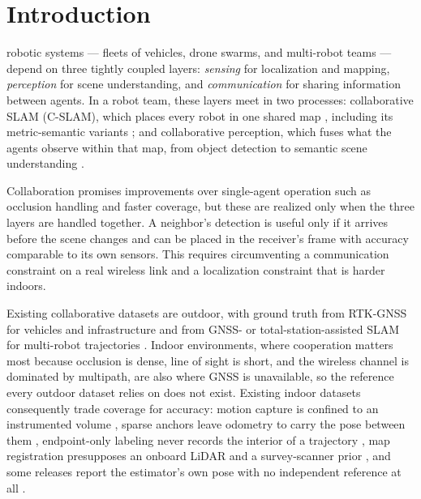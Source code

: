 \documentclass[journal]{IEEEtran}
\begin{document}
\section{Introduction}
\label{sec:introduction}
 robotic systems --- fleets of vehicles, drone swarms, and
multi-robot teams --- depend on three tightly coupled layers:
\emph{sensing} for localization and mapping, \emph{perception} for
scene understanding, and \emph{communication} for sharing information
between agents. In a robot team, these layers meet in two processes:
collaborative SLAM (C-SLAM), which places every robot in one shared
map \cite{swarmslam,doorslam}, including its metric-semantic variants
\cite{kimeramulti}; and collaborative perception, which fuses what the
agents observe within that map, from object detection to semantic
scene understanding \cite{where2comm}.

Collaboration promises improvements over single-agent operation such
as occlusion handling and faster coverage, but these are realized only
when the three layers are handled together. A neighbor's detection is
useful only if it arrives before the scene changes and can be placed
in the receiver's frame with accuracy comparable to its own sensors.
This requires circumventing a communication constraint on a real
wireless link and a localization constraint that is harder indoors.

Existing collaborative datasets are outdoor, with ground truth from
RTK-GNSS for vehicles and infrastructure
\cite{dairv2x,deepsense6g,v2v4real} and from GNSS- or
total-station-assisted SLAM for multi-robot trajectories
\cite{kimeramulti}. Indoor environments, where cooperation matters
most because occlusion is dense, line of sight is short, and the
wireless channel is dominated by multipath, are also where GNSS is
unavailable, so the reference every outdoor dataset relies on does
not exist. Existing indoor datasets consequently trade coverage for
accuracy: motion capture is confined to an instrumented volume
\cite{utias,m2dgr}, sparse anchors leave odometry to carry the pose
between them \cite{hilti2022,airmuseum}, endpoint-only labeling never
records the interior of a trajectory \cite{s3e}, map registration
presupposes an onboard LiDAR and a survey-scanner prior
\cite{subtmrs}, and some releases report the estimator's own pose with
no independent reference at all \cite{coped}.
\end{document}
